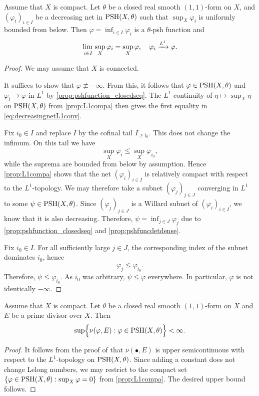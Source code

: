 \begin{corollary}\label{cor:decreasingnetL1conv}
    Assume that $X$ is compact. Let $\theta$ be a closed real smooth $(1,1)$-form on $X$, and $(\varphi_i)_{i\in I}$ be a decreasing net in $\mathrm{PSH}(X,\theta)$ such that $\sup_X \varphi_i$ is uniformly bounded from below. Then $\varphi=\inf_{i\in I} \varphi_i$ is a $\theta$-psh function and 
    \begin{equation}\label{eq:decreasingnetL1conv}
    \adjustlimits\lim_{i\in I}\sup_X \varphi_i=\sup_X \varphi,\quad \varphi_i\xrightarrow{L^1}\varphi.
    \end{equation}
\end{corollary}
\begin{proof}
    We may assume that $X$ is connected.

    It suffices to show that $\varphi\not\equiv -\infty$. From this, it follows that $\varphi\in \mathrm{PSH}(X,\theta)$ and $\varphi_i\to \varphi$ in $L^1$ by \cref{prop:pshfunction_closedseq}. The $L^1$-continuity of $\eta\mapsto \sup_X\eta$ on $\mathrm{PSH}(X,\theta)$ from \cref{prop:L1compa} then gives the first equality in \eqref{eq:decreasingnetL1conv}.

    Fix $i_0\in I$ and replace $I$ by the cofinal tail $I_{\geq i_0}$. This does not change the infimum. On this tail we have
    \[
        \sup_X\varphi_i\leq \sup_X\varphi_{i_0},
    \]
    while the suprema are bounded from below by assumption. Hence \cref{prop:L1compa} shows that the net $(\varphi_i)_{i\in I}$ is relatively compact with respect to the $L^1$-topology. We may therefore take a subnet $(\varphi_j)_{j\in J}$ converging in $L^1$ to some $\psi\in\mathrm{PSH}(X,\theta)$. Since $(\varphi_j)_{j\in J}$ is a Willard subnet of $(\varphi_i)_{i\in I}$, we know that it is also decreasing. Therefore, $\psi=\inf_{j\in J} \varphi_j$ due to \cref{prop:pshfunction_closedseq} and \cref{prop:pshfuncdetdense}.

    Fix $i_0\in I$. For all sufficiently large $j\in J$, the corresponding index of the subnet dominates $i_0$, hence
    \[
        \varphi_j\leq \varphi_{i_0}.
    \]
    Therefore, $\psi\leq \varphi_{i_0}$. As $i_0$ was arbitrary, $\psi\leq \varphi$ everywhere. In particular, $\varphi$ is not identically $-\infty$.
\end{proof}


\begin{proposition}\label{prop:Lelongnumberupperbound}
Assume that $X$ is compact.
    Let $\theta$ be a closed real smooth $(1,1)$-form on $X$ and $E$ be a prime divisor over $X$.
    Then
    \[
        \sup \Bigl\{ \nu(\varphi,E): \varphi\in \mathrm{PSH}(X,\theta) \Bigr\}<\infty.
    \]
\end{proposition}
\begin{proof}
    It follows from the proof of \cite[Exercise~2.7]{GZ17} that $\nu(\bullet,E)$ is upper semicontinuous with respect to the $L^1$-topology on $\mathrm{PSH}(X,\theta)$. Since adding a constant does not change Lelong numbers, we may restrict to the compact set $\{\varphi\in \mathrm{PSH}(X,\theta):\sup_X\varphi=0\}$ from \cref{prop:L1compa}. The desired upper bound follows.
\end{proof}

